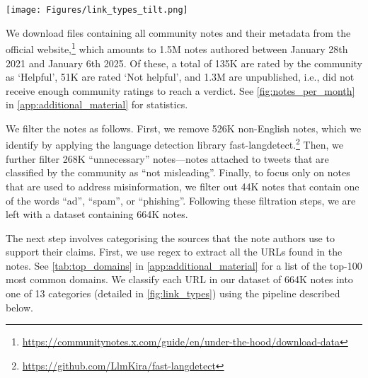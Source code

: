 \begin{figure*}[ht]
    \centering
    \texttt{[image: Figures/link\_types\_tilt.png]}
    \caption{The categories of links used by Community notes' authors as a source.}
    \label{fig:link_types}
\end{figure*}

We download files containing all community notes and their metadata from the official website,\footnote{\url{https://communitynotes.x.com/guide/en/under-the-hood/download-data}} which amounts to 1.5M notes authored between January 28th 2021 and January 6th 2025. Of these, a total of 135K are rated by the community as `Helpful', 51K are rated `Not helpful', and 1.3M are unpublished, i.e., did not receive enough community ratings to reach a verdict. See \cref{fig:notes_per_month} in \cref{app:additional_material} for statistics.

We filter the notes as follows. First, we remove 526K non-English notes, which we identify by applying the language detection library fast-langdetect.\footnote{\url{https://github.com/LlmKira/fast-langdetect}} Then, we further filter 268K ``unnecessary'' notes---notes attached to tweets that are classified by the community as ``not misleading''. Finally, to focus only on notes that are used to address misinformation, we filter out 44K notes that contain one of the words ``ad'', ``spam'', or ``phishing''. Following these filtration steps, we are left with a dataset containing 664K notes.

The next step involves categorising the sources that the note authors use to support their claims. First, we use regex to extract all the URLs found in the notes. See \cref{tab:top_domains} in \cref{app:additional_material} for a list of the top-100 most common domains. We classify each URL in our dataset of 664K notes into one of 13 categories (detailed in \cref{fig:link_types}) using the pipeline described below.

